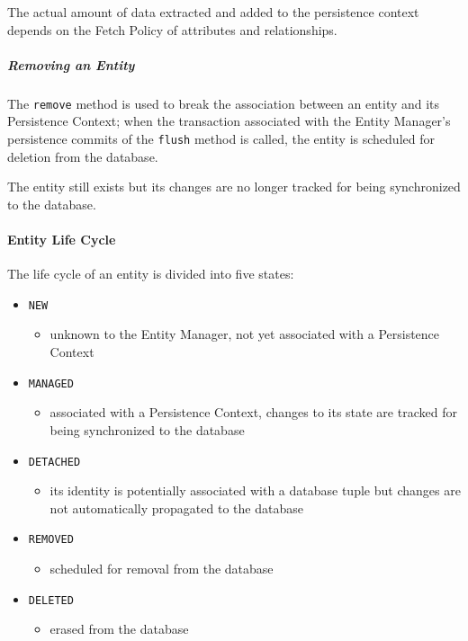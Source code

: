 \documentclass[english]{article}
\begin{document}
The actual amount of data extracted and added to the persistence context depends on the Fetch Policy of attributes and relationships.

\subparagraph*{Removing an Entity}
The \texttt{remove} method is used to break the association between an entity and its Persistence Context;
when the transaction associated with the Entity Manager's persistence commits of the \texttt{flush} method is called, the entity is scheduled for deletion from the database.

The entity still exists but its changes are no longer tracked for being synchronized to the database.

\paragraph{Entity Life Cycle}

The life cycle of an entity is divided into five states:

\begin{itemize}[label=\texttt{>}]
  \item \texttt{NEW}
        \begin{itemize}
          \item unknown to the Entity Manager, not yet associated with a Persistence Context
        \end{itemize}
  \item \texttt{MANAGED}
        \begin{itemize}
          \item associated with a Persistence Context, changes to its state are tracked for being synchronized to the database
        \end{itemize}
  \item \texttt{DETACHED}
        \begin{itemize}
          \item its identity is potentially associated with a database tuple but changes are not automatically propagated to the database
        \end{itemize}
  \item \texttt{REMOVED}
        \begin{itemize}
          \item scheduled for removal from the database
        \end{itemize}
  \item \texttt{DELETED}
        \begin{itemize}
          \item erased from the database
        \end{itemize}
\end{itemize}
\end{document}
